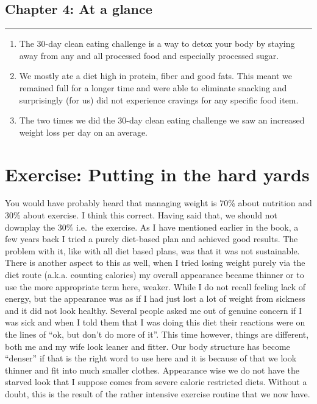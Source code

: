 \documentclass[
  oneside]{book}
\begin{document}
\hypertarget{chapter-4-at-a-glance}{%
\section{Chapter 4: At a glance}\label{chapter-4-at-a-glance}}

\begin{center}\rule{0.5\linewidth}{0.5pt}\end{center}

\begin{enumerate}
\def\labelenumi{\arabic{enumi}.}
\item
  The 30-day clean eating challenge is a way to detox your body by staying away from any and all processed food and especially processed sugar.
\item
  We mostly ate a diet high in protein, fiber and good fats. This meant we remained full for a longer time and were able to eliminate snacking and surprisingly (for us) did not experience cravings for any specific food item.
\item
  The two times we did the 30-day clean eating challenge we saw an increased weight loss per day on an average.
\end{enumerate}

\hypertarget{exercise-putting-in-the-hard-yards}{%
\chapter{Exercise: Putting in the hard yards}\label{exercise-putting-in-the-hard-yards}}

You would have probably heard that managing weight is 70\% about nutrition and 30\% about exercise. I think this correct. Having said that, we should not downplay the 30\% i.e.~the exercise. As I have mentioned earlier in the book, a few years back I tried a purely diet-based plan and achieved good results. The problem with it, like with all diet based plans, was that it was not sustainable. There is another aspect to this as well, when I tried losing weight purely via the diet route (a.k.a. counting calories) my overall appearance became thinner or to use the more appropriate term here, weaker. While I do not recall feeling lack of energy, but the appearance was as if I had just lost a lot of weight from sickness and it did not look healthy. Several people asked me out of genuine concern if I was sick and when I told them that I was doing this diet their reactions were on the lines of ``ok, but don't do more of it''. This time however, things are different, both me and my wife look leaner and fitter. Our body structure has become ``denser'' if that is the right word to use here and it is because of that we look thinner and fit into much smaller clothes. Appearance wise we do not have the starved look that I suppose comes from severe calorie restricted diets. Without a doubt, this is the result of the rather intensive exercise routine that we now have.
\end{document}
